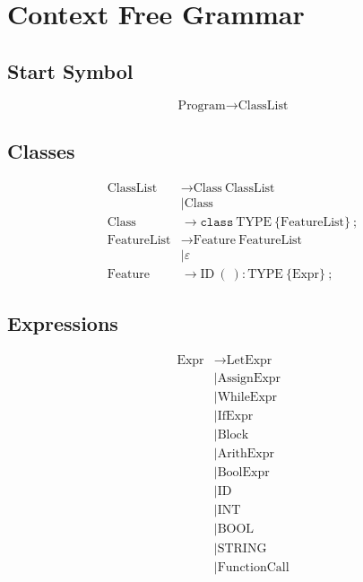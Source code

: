 \documentclass[12pt,a4paper]{article}
\begin{document}
\section{Context Free Grammar}
\subsection{Start Symbol}

\[
\text{Program} \rightarrow \text{ClassList}
\]

\subsection{Classes}

\begin{align*}
\text{ClassList} &\rightarrow \text{Class}\ \text{ClassList} \\
                 &\mid \text{Class} \\[6pt]
\text{Class} &\rightarrow \texttt{class}\ \text{TYPE}\ \{ \text{FeatureList} \}\ ; \\[6pt]
\text{FeatureList} &\rightarrow \text{Feature}\ \text{FeatureList} \\
                   &\mid \varepsilon \\[6pt]
\text{Feature} &\rightarrow \text{ID}\ ( \ ) : \text{TYPE}\ \{ \text{Expr} \}\ ;
\end{align*}

\subsection{Expressions}

\begin{align*}
\text{Expr} &\rightarrow \text{LetExpr} \\
            &\mid \text{AssignExpr} \\
            &\mid \text{WhileExpr} \\
            &\mid \text{IfExpr} \\
            &\mid \text{Block} \\
            &\mid \text{ArithExpr} \\
            &\mid \text{BoolExpr} \\
            &\mid \text{ID} \\
            &\mid \text{INT} \\
            &\mid \text{BOOL} \\
            &\mid \text{STRING} \\
            &\mid \text{FunctionCall}
\end{align*}
\end{document}
